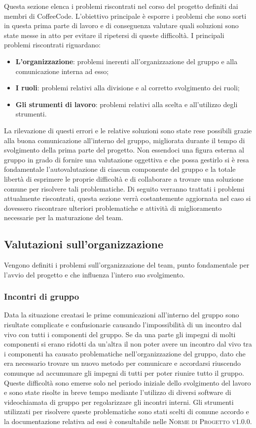 \documentclass[../piano-di-qualifica.tex]{subfiles}
\begin{document}
Questa sezione elenca i problemi riscontrati nel corso del progetto definiti dai membri di CoffeeCode.
L'obiettivo principale è esporre i problemi che sono sorti in questa prima parte di lavoro e di conseguenza valutare quali soluzioni sono state messe in atto per evitare il ripetersi di queste difficoltà.
I principali problemi riscontrati riguardano:
\begin{itemize}
    \item \textbf{L'organizzazione}: problemi inerenti all'organizzazione del gruppo e alla comunicazione interna ad esso;
    \item \textbf{I ruoli}: problemi relativi alla divisione e al corretto svolgimento dei ruoli;
    \item \textbf{Gli strumenti di lavoro}: problemi relativi alla scelta e all'utilizzo degli strumenti.
\end{itemize}
La rilevazione di questi errori e le relative soluzioni sono state rese possibili grazie alla buona comunicazione all'interno del gruppo, migliorata durante il tempo di svolgimento della prima parte del progetto.
Non essendoci una figura esterna al gruppo in grado di fornire una valutazione oggettiva e che possa gestirlo si è resa fondamentale l'autovalutazione di ciascun componente del gruppo e la totale libertà di esprimere le proprie difficoltà e di collaborare a trovare una soluzione comune per risolvere tali problematiche.
Di seguito verranno trattati i problemi attualmente riscontrati, questa sezione verrà costantemente aggiornata nel caso si dovessero riscontrare ulteriori problematiche e attività di miglioramento necessarie per la maturazione del team.

\subsection{Valutazioni sull’organizzazione}
\label{sub:valutazioni_organizzazione}
Vengono definiti i problemi sull'organizzazione del team, punto fondamentale per l'avvio del progetto e che influenza l'intero suo svolgimento.

\subsubsection{Incontri di gruppo}
\label{sub:incontri_di_gruppo}
Data la situazione creatasi le prime comunicazioni all'interno del gruppo sono risultate complicate e confusionarie causando l'impossibilità di un incontro dal vivo con tutti i componenti del gruppo.
Se da una parte gli impegni di molti componenti si erano ridotti da un'altra il non poter avere un incontro dal vivo tra i componenti ha causato problematiche nell'organizzazione del gruppo, dato che era necessario trovare un nuovo metodo per comunicare e accordarsi riuscendo comunque ad accumunare gli impegni di tutti per poter riunire tutto il gruppo.
Queste difficoltà sono emerse solo nel periodo iniziale dello svolgimento del lavoro e sono state risolte in breve tempo mediante l'utilizzo di diversi software di videochiamata di gruppo per regolarizzare gli incontri interni.
Gli strumenti utilizzati per risolvere queste problematiche sono stati scelti di comune accordo e la documentazione relativa ad essi è consultabile nelle \textsc{Norme di Progetto v1.0.0}.
\end{document}
